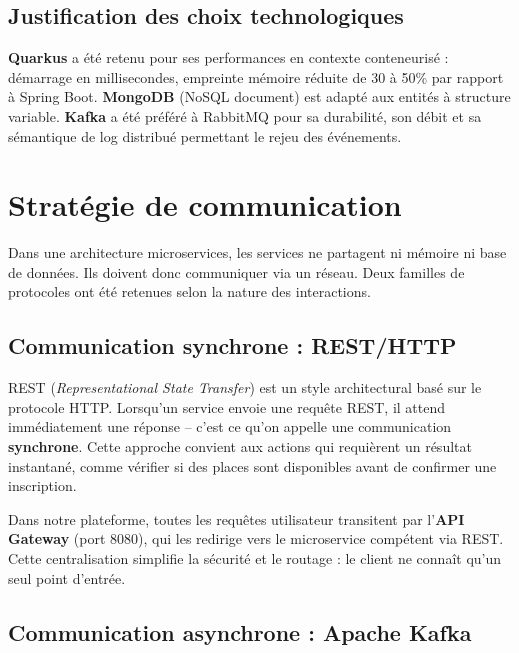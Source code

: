 \documentclass[12pt,a4paper]{report}
\begin{document}
\subsection{Justification des choix technologiques}

\textbf{Quarkus} a \'et\'e retenu pour ses performances en contexte conteneuris\'e :
d\'emarrage en millisecondes, empreinte m\'emoire r\'eduite de 30 \`a 50\% par rapport
\`a Spring Boot. \textbf{MongoDB} (NoSQL document) est adapt\'e aux entit\'es \`a structure
variable. \textbf{Kafka} a \'et\'e pr\'ef\'er\'e \`a RabbitMQ pour sa durabilit\'e, son d\'ebit
et sa s\'emantique de log distribu\'e permettant le rejeu des \'ev\'enements.

\section{Strat\'egie de communication}

Dans une architecture microservices, les services ne partagent ni m\'emoire ni base de
donn\'ees. Ils doivent donc communiquer via un r\'eseau. Deux familles de protocoles ont
\'et\'e retenues selon la nature des interactions.

\subsection{Communication synchrone : REST/HTTP}

REST (\textit{Representational State Transfer}) est un style architectural bas\'e sur le
protocole HTTP. Lorsqu'un service envoie une requ\^ete REST, il attend imm\'ediatement une
r\'eponse -- c'est ce qu'on appelle une communication \textbf{synchrone}. Cette approche
convient aux actions qui requi\`erent un r\'esultat instantan\'e, comme v\'erifier si
des places sont disponibles avant de confirmer une inscription.

Dans notre plateforme, toutes les requ\^etes utilisateur transitent par l'\textbf{API Gateway}
(port 8080), qui les redirige vers le microservice comp\'etent via REST. Cette centralisation
simplifie la s\'ecurit\'e et le routage : le client ne conna\^it qu'un seul point d'entr\'ee.

\subsection{Communication asynchrone : Apache Kafka}
\end{document}
